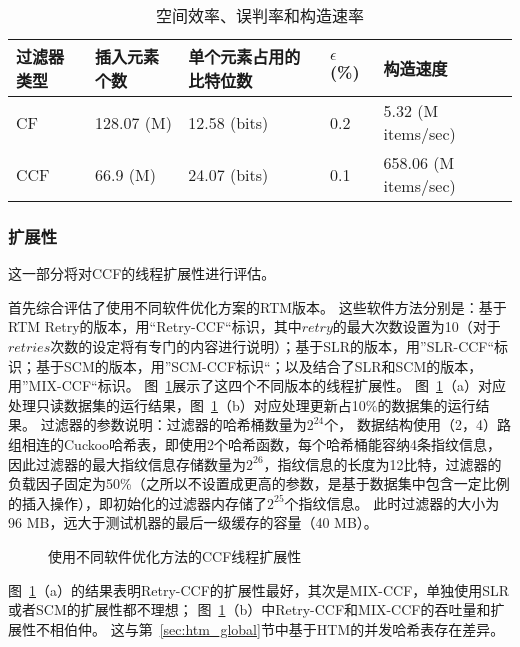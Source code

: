 \begin{table}[htbp]
  \centering
  \caption{空间效率、误判率和构造速率}
  \label{tab:cf_space}
  \begin{tabular}{lllll}
    \toprule
      过滤器类型  & 插入元素个数 & 单个元素占用的比特位数 & $\epsilon$ (\%) &  构造速度  \\
    \midrule
      CF   &  128.07 (M) & 12.58 (bits) &  0.2       &  5.32 (M items/sec)  \\
      CCF  &  66.9 (M)  & 24.07 (bits)  &  0.1       &  658.06 (M items/sec) \\
    \bottomrule
  \end{tabular}
\end{table}

\subsubsection{扩展性}
这一部分将对CCF的线程扩展性进行评估。

首先综合评估了使用不同软件优化方案的RTM版本。
这些软件方法分别是：基于RTM Retry的版本，用“Retry-CCF“标识，其中$retry$的最大次数设置为10（对于$retries$次数的设定将有专门的内容进行说明）；基于SLR的版本，用”SLR-CCF“标识；基于SCM的版本，用”SCM-CCF标识“；以及结合了SLR和SCM的版本，用”MIX-CCF“标识。
图~\ref{fig:cf-locks}展示了这四个不同版本的线程扩展性。
图~\ref{fig:cf-locks}（a）对应处理只读数据集的运行结果，图~\ref{fig:cf-locks}（b）对应处理更新占10\%的数据集的运行结果。
过滤器的参数说明：过滤器的哈希桶数量为$2^{24}$个，
数据结构使用（2，4）路组相连的Cuckoo哈希表，即使用2个哈希函数，每个哈希桶能容纳4条指纹信息，因此过滤器的最大指纹信息存储数量为$2^{26}$，指纹信息的长度为12比特，过滤器的负载因子固定为50\%（之所以不设置成更高的参数，是基于数据集中包含一定比例的插入操作），即初始化的过滤器内存储了$2^{25}$个指纹信息。
此时过滤器的大小为96 MB，远大于测试机器的最后一级缓存的容量（40 MB）。

\begin{figure}[htbp]
\centering
\caption{使用不同软件优化方法的CCF线程扩展性}
\label{fig:cf-locks}
\end{figure}
图~\ref{fig:cf-locks}（a）的结果表明Retry-CCF的扩展性最好，其次是MIX-CCF，单独使用SLR或者SCM的扩展性都不理想；
图~\ref{fig:cf-locks}（b）中Retry-CCF和MIX-CCF的吞吐量和扩展性不相伯仲。
这与第~\ref{sec:htm_global}节中基于HTM的并发哈希表存在差异。

